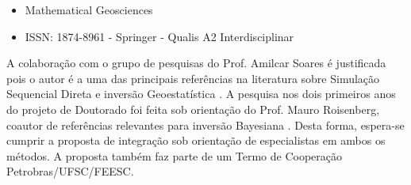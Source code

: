 \begin{itemize}
  \setlength{\itemsep}{0pt}
  \setlength{\parskip}{0pt}
  \item Mathematical Geosciences
  \item ISSN: 1874-8961 - Springer - Qualis A2 Interdisciplinar
\end{itemize}


A colaboração com o grupo de pesquisas do Prof. Amilcar Soares é justificada
pois o autor é a uma das principais referências na literatura sobre Simulação
Sequencial Direta e inversão Geoestatística
\citep{azevedo2013_avoinv,amilcarInversao,2001amilcarDSS}. A pesquisa nos dois
primeiros anos do projeto de Doutorado foi feita sob orientação do Prof. Mauro
Roisenberg, coautor de referências relevantes para inversão Bayesiana
\citep{leandro_SEG,leandroGRSL}. Desta forma, espera-se cumprir a proposta de
integração sob orientação de especialistas em ambos os métodos. A proposta
também faz parte de um Termo de Cooperação Petrobras/UFSC/FEESC.


